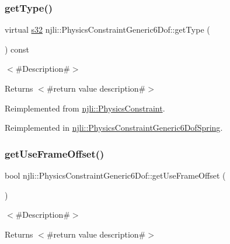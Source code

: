\subsubsection{\texorpdfstring{get\+Type()}{getType()}}
{\footnotesize\ttfamily virtual \mbox{\hyperlink{_util_8h_aa62c75d314a0d1f37f79c4b73b2292e2}{s32}} njli\+::\+Physics\+Constraint\+Generic6\+Dof\+::get\+Type (\begin{DoxyParamCaption}{ }\end{DoxyParamCaption}) const\hspace{0.3cm}{\ttfamily [virtual]}}

$<$\#\+Description\#$>$

\begin{DoxyReturn}{Returns}
$<$\#return value description\#$>$ 
\end{DoxyReturn}


Reimplemented from \mbox{\hyperlink{classnjli_1_1_physics_constraint_a3234aefaf2706165fbc52b5b37c05888}{njli\+::\+Physics\+Constraint}}.



Reimplemented in \mbox{\hyperlink{classnjli_1_1_physics_constraint_generic6_dof_spring_a2fecef82051a7d6f1a51a81ca5621798}{njli\+::\+Physics\+Constraint\+Generic6\+Dof\+Spring}}.

\mbox{\label{classnjli_1_1_physics_constraint_generic6_dof_a5e88bda1b6f298611499a60e0a431587}} 
\subsubsection{\texorpdfstring{get\+Use\+Frame\+Offset()}{getUseFrameOffset()}}
{\footnotesize\ttfamily bool njli\+::\+Physics\+Constraint\+Generic6\+Dof\+::get\+Use\+Frame\+Offset (\begin{DoxyParamCaption}{ }\end{DoxyParamCaption})}

$<$\#\+Description\#$>$

\begin{DoxyReturn}{Returns}
$<$\#return value description\#$>$ 
\end{DoxyReturn}
\mbox{\label{classnjli_1_1_physics_constraint_generic6_dof_a4b7ccf539945ec18862d03459cc7af4d}} 
